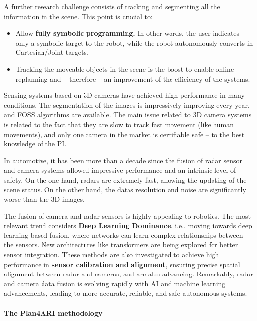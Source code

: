 A further research challenge consists of tracking and segmenting all the
information in the scene. This point is crucial to:

\begin{itemize}
\item
  Allow \textbf{fully symbolic programming.} In other words, the user
  indicates only a symbolic target to the robot, while the robot
  autonomously converts in Cartesian/Joint targets.
\item
  Tracking the moveable objects in the scene is the boost to enable
  online replanning and -- therefore -- an improvement of the efficiency
  of the systems.
\end{itemize}

Sensing systems based on 3D cameras have achieved high performance in
many conditions. The segmentation of the images is impressively
improving every year, and FOSS algorithms are available. The main issue
related to 3D camera systems is related to the fact that they are slow
to track fast movement (like human movements), and only one camera in
the market is certifiable safe -- to the best knowledge of the PI.

In automotive, it has been more than a decade since the fusion of radar
sensor and camera systems allowed impressive performance and an
intrinsic level of safety. On the one hand, radars are extremely fast,
allowing the updating of the scene status. On the other hand, the
data\textquotesingle s resolution and noise are significantly worse than
the 3D images.

The fusion of camera and radar sensors is highly appealing to robotics.
The most relevant trend considers \textbf{Deep Learning Dominance},
i.e., moving towards deep learning-based fusion, where networks can
learn complex relationships between the sensors. New architectures like
transformers are being explored for better sensor integration. These
methods are also investigated to achieve high performance in
\textbf{sensor calibration and alignment}, ensuring precise spatial
alignment between radar and cameras, and are also advancing. Remarkably,
radar and camera data fusion is evolving rapidly with AI and machine
learning advancements, leading to more accurate, reliable, and safe
autonomous systems.

\paragraph{The Plan4ARI methodology}\label{the-plan4ari-methodology-1}


